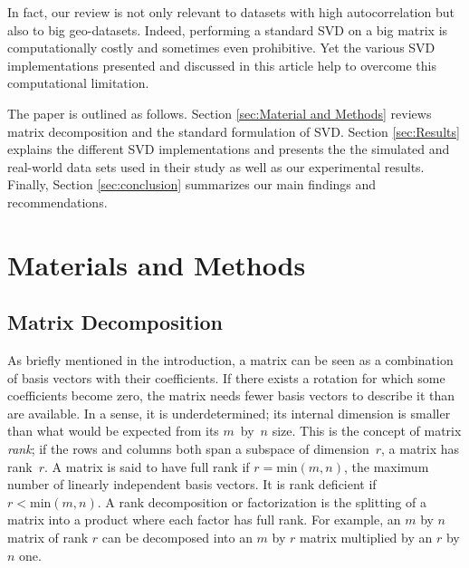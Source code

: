 \documentclass[ijgi,article,submit,moreauthors,pdftex,10pt,a4paper]{Definitions/mdpi}
\begin{document}
In fact, our review is not only relevant to datasets with high autocorrelation but also to big geo-datasets. Indeed, performing a standard SVD on a
big matrix is computationally costly and sometimes even prohibitive. Yet the various SVD implementations presented and discussed in this article help
to overcome this computational limitation. 

The paper is outlined as follows. Section \ref{sec:Material and Methods} reviews matrix decomposition and the standard formulation of SVD. Section
\ref{sec:Results} explains the different SVD implementations and presents the the simulated and real-world data sets used in their study
as well as our experimental results. Finally, Section \ref{sec:conclusion} summarizes our main findings and recommendations.

\section{Materials and Methods}
\label{sec:Materials and Methods}


\subsection{Matrix Decomposition}
As briefly mentioned in the introduction, a matrix can be seen as a combination of basis vectors with their coefficients. If there exists a rotation
for which some coefficients become zero, the matrix needs fewer basis vectors to describe it than are available. In a sense, it is underdetermined;
its internal dimension is smaller than what would be expected from its $m$~by~$n$ size. This is the concept of matrix \textit{rank}; if the rows and
columns both span a subspace of dimension~$r$, a matrix has rank~$r$. A matrix is said to have full rank if $r = \text{min}(m, n)$, the maximum number
of linearly independent basis vectors. It is rank deficient if $r < \text{min}(m, n)$. A rank decomposition or factorization is the splitting of a
matrix into a product where each factor has full rank. For example, an $m$ by $n$ matrix of rank $r$ can be decomposed into an $m$ by $r$ matrix
multiplied by an $r$ by $n$ one.
\end{document}
